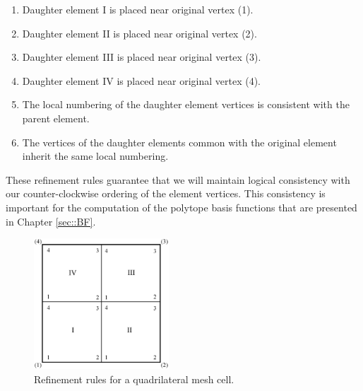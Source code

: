 \begin{enumerate}
\item Daughter element I is placed near original vertex (1).
\item Daughter element II is placed near original vertex (2).
\item Daughter element III is placed near original vertex (3).
\item Daughter element IV is placed near original vertex (4).
\item The local numbering of the daughter element vertices is consistent with the parent element.
\item The vertices of the daughter elements common with the original element inherit the same local numbering.
\end{enumerate}

\noindent These refinement rules guarantee that we will maintain logical consistency with our counter-clockwise ordering of the element vertices. This consistency is important for the computation of the polytope basis functions that are presented in Chapter \ref{sec::BF}.

\begin{figure}
\centering
\includegraphics[width=0.45\textwidth]{figures/sec_Sn/Quad_cell_refinement_rules.eps}
\caption{Refinement rules for a quadrilateral mesh cell.}
\label{fig::Sn_Solution_Spatial_AMR_quadrefrules}
\end{figure}

